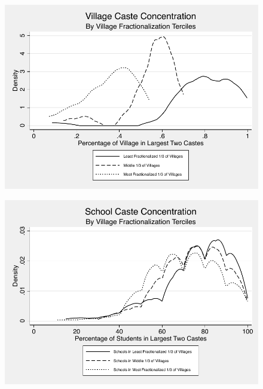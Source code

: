 \documentclass{beamer}
\begin{document}
\begin{frame}{}
	\begin{figure}[htb]
		\begin{center}
		\includegraphics[scale=0.8]{graphs/village_toptwo.pdf}
		\end{center}
	\end{figure}
\end{frame}

\begin{frame}{}
	\begin{figure}[htb]
		\begin{center}
		\includegraphics[scale=0.8]{graphs/school_toptwo.pdf}
		\end{center}
	\end{figure}
\end{frame}
\end{document}
